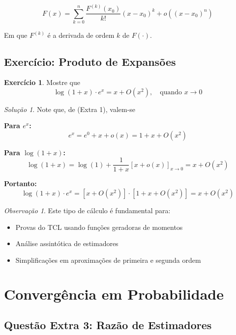 \documentclass[12pt,a4paper]{article}
\theoremstyle{definition}
\newtheorem{exercicio}{Exercício}[section]
\theoremstyle{remark}
\newtheorem{solucao}{Solução}[section]
\newtheorem{observacao}{Observação}[section]
\begin{document}
\begin{equation}
F(x) = \sum_{k=0}^{n} \frac{F^{(k)}(x_0)}{k!} (x - x_0)^k + o\left( (x - x_0)^n \right)
\tag{Extra 1}
\end{equation}

Em que $F^{(k)}$ é a derivada de ordem $k$ de $F(\cdot)$.

\subsection{Exercício: Produto de Expansões}

\begin{exercicio}
Mostre que
\[
\log(1+x) \cdot e^x = x + O(x^2), \quad \text{quando } x \to 0
\]
\end{exercicio}

\begin{solucao}
Note que, de (Extra 1), valem-se

\textbf{Para $e^x$:}
\begin{equation}
e^x = e^0 + x + o(x) = 1 + x + O(x^2)
\end{equation}

\textbf{Para $\log(1+x)$:}
\begin{equation}
\log(1+x) = \log(1) + \frac{1}{1+x} \left[ x + o(x) \right]_{x \to 0} = x + O(x^2)
\end{equation}

\textbf{Portanto:}
\[
\log(1+x) \cdot e^x = [x + O(x^2)] \cdot [1 + x + O(x^2)] = x + O(x^2)
\]
\end{solucao}

\begin{observacao}
Este tipo de cálculo é fundamental para:
\begin{itemize}
    \item Provas do TCL usando funções geradoras de momentos
    \item Análise assintótica de estimadores
    \item Simplificações em aproximações de primeira e segunda ordem
\end{itemize}
\end{observacao}

\section{Convergência em Probabilidade}

\subsection{Questão Extra 3: Razão de Estimadores}
\end{document}
